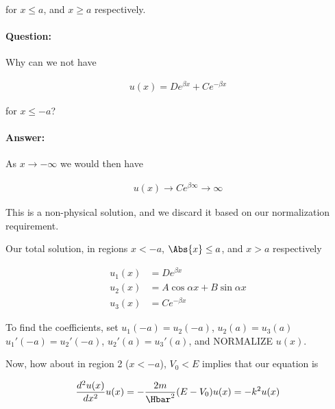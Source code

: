 for $x \le a$, and $x \ge a$ respectively.

\paragraph{Question:} Why can we not have

\begin{equation}\label{eqn:PHY356Lecture9:36}
\begin{aligned}
u(x) = D e^{\beta x} + C e^{-\beta x}
\end{aligned}
\end{equation}

for $x \le -a$?

\paragraph{Answer:} As $x \rightarrow -\infty$ we would then have

\begin{equation}\label{eqn:lecture9boundStates:280}
\begin{aligned}
u(x) \rightarrow C e^{\beta \infty} \rightarrow \infty
\end{aligned}
\end{equation}

This is a non-physical solution, and we discard it based on our normalization requirement.

Our total solution, in regions $x < -a$, $\Abs{x} \le a$, and $x > a$ respectively

\begin{equation}\label{eqn:lecture9boundStates:300}
\begin{aligned}
u_1(x) &= D e^{\beta x} \\
u_2(x) &= A \cos\alpha x + B \sin\alpha x \\
u_3(x) &= C e^{-\beta x}
\end{aligned}
\end{equation}

To find the coefficients, set $u_1(-a) = u_2(-a)$, $u_2(a) = u_3(a)$ $u_1'(-a) = u_2'(-a)$, $u_2'(a) = u_3'(a)$, and NORMALIZE $u(x)$.

Now, how about in region 2 ($x < -a$), $V_0 < E$ implies that our equation is

\begin{equation}\label{eqn:PHY356Lecture9:40}
\begin{aligned}
\frac{d^2 u(x)}{dx^2} u(x) = - \frac{2m}{\Hbar^2} (E - V_0) u(x) = - k^2 u(x)
\end{aligned}
\end{equation}

